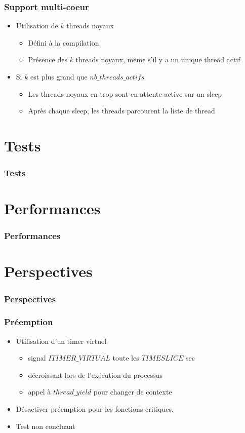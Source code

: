 \documentclass{beamer}
\begin{document}
\begin{frame}
  \frametitle{Support multi-coeur}
  \begin{itemize}
    \item Utilisation de $k$ threads noyaux
      \begin{itemize}
      \item Défini à la compilation
      \item Présence des $k$ threads noyaux, même s'il y a un unique thread
        actif
      \end{itemize}
    \item Si $k$ est plus grand que $nb\_threads\_actifs$
      \begin{itemize}
        \item Les threads noyaux en trop sont en attente active sur un sleep
        \item Après chaque sleep, les threads parcourent la liste de thread
      \end{itemize}
  \end{itemize}
\end{frame}

\section{Tests}

\begin{frame}
  \frametitle{Tests}
\end{frame}

\section{Performances}

\begin{frame}
  \frametitle{Performances}
\end{frame}

\section{Perspectives}

\begin{frame}
  \frametitle{Perspectives}
\end{frame}

\begin{frame}
  \frametitle{Préemption}
  \begin{itemize}
    \item Utilisation d'un timer virtuel
      \begin{itemize}
      \item signal $ITIMER\_VIRTUAL$ toute les $TIMESLICE$ sec
      \item décroissant lors de l'exécution du processus
      \item appel à $thread\_yield$ pour changer de contexte
      \end{itemize}
    \item Désactiver préemption pour les fonctions critiques.
    \item Test non concluant
  \end{itemize}
\end{frame}
\end{document}
